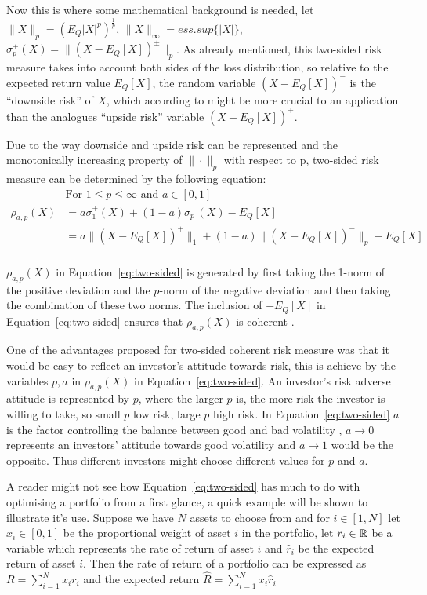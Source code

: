 \documentclass{pdfmx4020}
\begin{document}
  Now this is where some mathematical background is needed, let $\| X \|_p = (E_Q |X|^p)^{\frac{1}{p}}$, $\|X\|_\infty = ess.sup \{ |X|\}$, $\sigma_p^{\pm} (X) = \|(X-E_Q[X])^{\pm}\|_p$. As already mentioned, this two-sided risk measure takes into account both sides of the loss distribution, so relative to the expected return value $E_Q[X]$, the random variable $(X-E_Q[X])^-$ is the ``downside risk'' of $X$, which according to \cite{two_sided_risk} might be more crucial to an application than the analogues ``upside risk'' variable $(X-E_Q[X])^+$.

  Due to the way downside and upside risk can be represented and the monotonically increasing property of $\| \cdot \|_p$ with respect to p, two-sided risk measure can be determined by the following equation:
  \begin{equation} \label{eq:two-sided}
    \begin{split}
      & \text{For } 1 \leq p \leq \infty \text{ and } a \in [0,1] \\
      \rho_{a,p}(X) & = a \sigma_1^+(X) + (1-a)\sigma_p^-(X) - E_Q[X ]\\
      & = a \|(X-E_Q[X])^+\|_1 + (1-a) \|(X-E_Q[X])^-\|_p - E_Q[X] \\
    \end{split}
  \end{equation}

  $\rho_{a,p}(X)$ in Equation~\ref{eq:two-sided} is generated by first taking the 1-norm of the positive deviation and the $p$-norm of the negative deviation and then taking the combination of these two norms. The inclusion of $- E_Q[X]$ in Equation~\ref{eq:two-sided} ensures that $\rho_{a,p}(X)$ is coherent \cite{two_sided_risk}. 

  One of the advantages proposed for two-sided coherent risk measure was that it would be easy to reflect an investor's attitude towards risk, this is achieve by the variables $p,a$ in $\rho_{a,p}(X)$ in Equation~\ref{eq:two-sided}. An investor's risk adverse attitude is represented by $p$, where the larger $p$ is, the more risk the investor is willing to take, so small $p$ low risk, large $p$ high risk. In Equation~\ref{eq:two-sided} $a$ is the factor controlling the balance between good and bad volatility \cite{two_sided_risk}, $a \to 0$ represents an investors' attitude towards good volatility and $a \to 1$ would be the opposite. Thus different investors might choose different values for $p$ and $a$.

  A reader might not see how Equation~\ref{eq:two-sided} has much to do with optimising a portfolio from a first glance, a quick example will be shown to illustrate it's use. Suppose we have $N$ assets to choose from and for $i \in [1,N]$ let $x_i \in [0,1]$ be the proportional weight of asset $i$ in the portfolio, let $r_i \in \mathbb{R}$ be a variable which represents the rate of return of asset $i$ and $\widehat{r}_i$ be the expected return of asset $i$. Then the rate of return of a portfolio can be expressed as $R = \sum_{i=1}^N x_i r_i$ and the expected return $\widehat{R} = \sum_{i=1}^N  x_i \widehat{r}_i$
\end{document}
